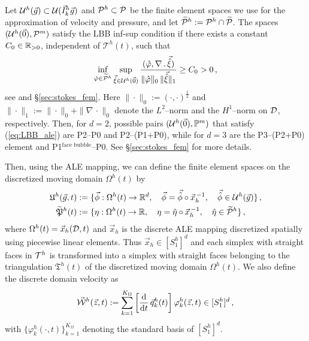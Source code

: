 Let $\uspacesemidiscref{g}{h}\subset\uspacesimpleref(\vec I_k^h\vec g)$ and
$\pspaceref^h\subset\pspaceref$ be the finite element spaces we use for the
approximation of velocity and pressure, and let $\pnormspaceref^h:=
\pspaceref^h\cap \pnormspaceref$. The spaces
$(\uspacesemidiscref{0}{h},\pspaceref^m)$ satisfy the LBB inf-sup condition
if there exists a constant $C_0 \in \R_{>0}$, independent of $\mathcal{T}^h(t)$,
such that
\begin{equation} \label{eq:LBB_ale}
\inf_{\hat \varphi \in \pnormspaceref^h} \sup_{\vec{\hat \xi} \in
\uspacesemidiscref{0}{h}}
\frac{( \hat \varphi, \nabla \,.\,\vec{ \hat \xi})} {\|\hat \varphi\|_0\,
\| \vec{\hat\xi}\|_1} \geq C_0 > 0\,,
\end{equation}
see \cite[p.~114]{GiraultR86} and \S\ref{sec:stokes_fem}. Here $\|\cdot\|_0 :=
(\cdot,\cdot)^\frac12$ and $\|\cdot\|_1 := \|\cdot\|_0 + \|\nabla\,\cdot\|_0$
denote the $L^2$--norm and the $H^1$--norm on $\D$, respectively. Then, for
$d=2$, possible pairs $(\uspacesemidiscref{0}{h},\pspace^m)$ that satisfy
(\ref{eq:LBB_ale}) are P2--P0 and P2--(P1+P0), while for $d=3$ are the
P3--(P2+P0) element and P1$^{\mbox{face bubble}}$--P0. See
\S\ref{sec:stokes_fem} for more details.

Then, using the ALE mapping, we can define the finite element spaces on
the discretized moving domain $\Omega^h(t)$ by
\begin{align*}
\uspacesemidiscale{g}{h}{t} &:= \{ \vec\phi:
\Omega^h(t) \to \R^d,\quad
\vec \phi=\vec{\hat\phi}\circ\vec x_h^{\,-1},\quad\vec{\hat\phi}
\in\uspacesemidiscref{g}{h}\}\,,\\
\pnormspaceale^h(t) &:= \{ \eta: \Omega^h(t)\to \R,\quad
\eta=\hat\eta\circ\vec x_h^{\,-1},\quad\hat\eta\in\pnormspaceref^h \}\,,
\end{align*}
where $\Omega^h(t)=\vec x_h(\D,t)$ and $\vec x_h$ is the discrete ALE mapping
discretized spatially using piecewise linear elements. Thus
$\vec x_h\in [S^h_1]^d$ and each simplex with straight faces in ${\cal
T}^h$ is transformed into a simplex with straight faces belonging to the
triangulation $\mathfrak{T}^h(t)$ of the discretized moving domain
$\Omega^h(t)$. We also define the discrete domain velocity as
\begin{equation}
\W^h(\vec z, t):=
\sum_{k=1}^{K_\Omega}\left[\ddt\,\vec q^h_k(t)\right] \varphi^h_k(\vec z, t)
\in [S^h_1]^d\,,
\end{equation}
with $\{\varphi^h_k(\cdot,t)\}_{k=1}^{K_\Omega}$ denoting the standard basis of
$[S^h_1]^d$.


